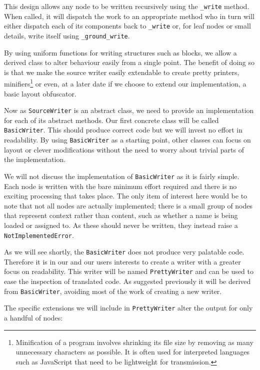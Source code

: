 \documentclass{report}
\begin{document}
This design allows any node to be written recursively using the \texttt{\_write} method. When called, it will dispatch the work to an appropriate method who
in turn will either dispatch each of its components back to \texttt{\_write} or, for leaf nodes or small details, write itself using
\texttt{\_ground\_write}.

By using uniform functions for writing structures such as blocks, we allow a derived class to alter behaviour easily from
a single point. The benefit of doing so is that we make the source writer easily extendable to create pretty printers,
minifiers\footnote{Minification of a program involves shrinking its file size by removing as many unnecessary characters as possible. It is
often used for interpreted languages such as JavaScript that need to be lightweight for transmission.} or even, at a later date if we choose
to extend our implementation, a basic layout obfuscator.

Now as \texttt{SourceWriter} is an abstract class, we need to provide an implementation for each of its abstract methods. Our first concrete class
will be called \texttt{BasicWriter}. This should produce correct code but we will invest no effort in readability. By using \texttt{BasicWriter} as
a starting point, other classes can focus on layout or clever modifications without the need to worry about trivial parts of the implementation.

We will not discuss the implementation of \texttt{BasicWriter} as it is fairly simple. Each node is written with the bare minimum effort required
and there is no exciting processing that takes place. The only item of interest here would be to note that not all nodes are actually implemented;
there is a small group of nodes that represent context rather than content, such as whether a name is being loaded or assigned to. As these should
never be written, they instead raise a \texttt{NotImplementedError}.

As we will see shortly, the \texttt{BasicWriter} does not produce very palatable code. Therefore it is in our and our users interests to
create a writer with a greater focus on readability. This writer will be named \texttt{PrettyWriter} and can be used to ease the inspection of
translated code. As suggested previously it will be derived from \texttt{BasicWriter}, avoiding most of the work of creating a new writer.

The specific extensions we will include in \texttt{PrettyWriter} alter the output for only a handful of nodes:
\end{document}
